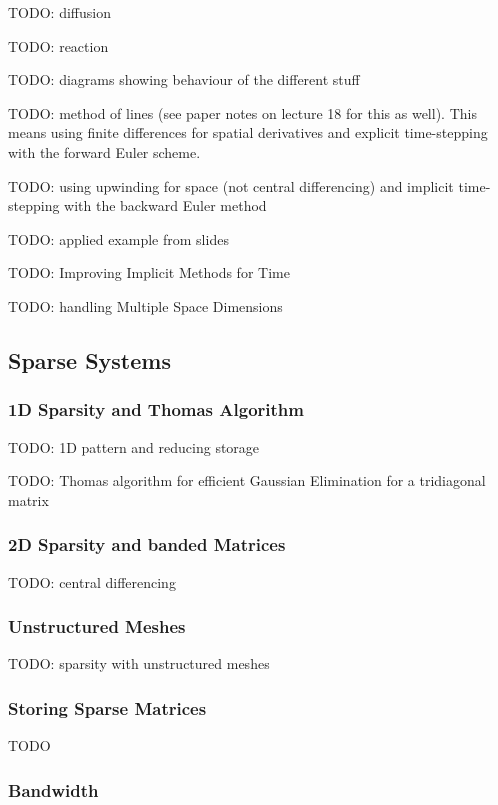 \documentclass{article}
\begin{document}
TODO: diffusion

TODO: reaction

TODO: diagrams showing behaviour of the different stuff

TODO: method of lines  (see paper notes on lecture 18 for this as well). This means using finite differences for spatial derivatives and explicit time-stepping with the forward Euler scheme.

TODO: using upwinding for space (not central differencing) and implicit time-stepping with the backward Euler method

TODO: applied example from slides

TODO: Improving Implicit Methods for Time

TODO: handling Multiple Space Dimensions

\subsection{Sparse Systems}

\subsubsection{1D Sparsity and Thomas Algorithm}

TODO: 1D pattern and reducing storage

TODO: Thomas algorithm for efficient Gaussian Elimination for a tridiagonal matrix

\subsubsection{2D Sparsity and banded Matrices}

TODO: central differencing

\subsubsection{Unstructured Meshes}

TODO: sparsity with unstructured meshes

\subsubsection{Storing Sparse Matrices}

TODO

\subsubsection{Bandwidth}
\end{document}
